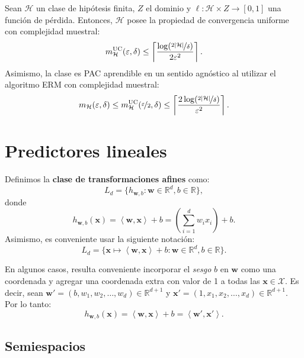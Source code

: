 \documentclass[8pt,a4paper]{extarticle}
\begin{document}
\begin{multicols}{3}
\begin{boxcor}[]
	Sean $\mathcal{H}$ un clase de hipótesis finita, $Z$ el dominio y  $ \ell : \mathcal{H} \times Z \to [0,1]$ una función de pérdida. Entonces, $\mathcal{H}$ posee la propiedad de convergencia uniforme con complejidad muestral:
	\[
		m_{\mathcal{H}}^{\text{\normalfont UC}} (\varepsilon, \delta) \le \left\lceil \frac{\log(\nicefrac{2\left| \mathcal{H} \right| }{\delta})}{2\varepsilon^2} \right\rceil 
	.\]
	Asimismo, la clase es PAC aprendible en un sentido agnóstico al utilizar el algoritmo ERM con complejidad muestral:
	\[
		m_{\mathcal{H}} (\varepsilon, \delta) \le m_{\mathcal{H}}^{\text{\normalfont UC}} (\nicefrac{\varepsilon}{2}, \delta) \le \left\lceil \frac{2\log(\nicefrac{2\left| \mathcal{H} \right| }{\delta})}{\varepsilon^2} \right\rceil 
	.\] 
\end{boxcor}

\newpage

\section{Predictores lineales}

\begin{boxdef}
	Definimos la \textbf{clase de transformaciones afines} como:
	\[
		L_{d} = \{h_{\mathbf{w}, b} : \mathbf{w} \in \mathbb{R}^d, b \in \mathbb{R}\} 
	,\] 
	donde
	\[
		h_{\mathbf{w}, b} (\mathbf{x}) = \left< \mathbf{w}, \mathbf{x} \right> + b = \left( \sum_{i = 1}^{d} w_i x_i \right) + b
	.\] 
	Asimismo, es conveniente usar la siguiente notación:
	\[
	L_{d} = \{ \mathbf{x} \mapsto \left< \mathbf{w}, \mathbf{x} \right> + b : \mathbf{w} \in \mathbb{R}^d, b \in \mathbb{R} \} 
	.\] 
\end{boxdef}

\begin{boxrmk}[]
	En algunos casos, resulta conveniente incorporar el \emph{sesgo} $b$ en  $ \mathbf{w}$ como una coordenada y agregar una coordenada extra con valor de 1 a todas las $ \mathbf{x}  \in \mathcal{X}$. Es decir, sean $ \mathbf{w}' = (b, w_1, w_2, \ldots, w_d) \in \mathbb{R}^{d + 1}$ y $ \mathbf{x}' = (1, x_1, x_2, \ldots, x_d) \in \mathbb{R}^{d + 1}$. Por lo tanto:
	\[
		h_{\mathbf{w}, b} (\mathbf{x}) = \left< \mathbf{w}, \mathbf{x} \right> + b = \left< \mathbf{w}', \mathbf{x}' \right>
	.\] 
\end{boxrmk}

\subsection{Semiespacios}


\end{multicols}
\end{document}
